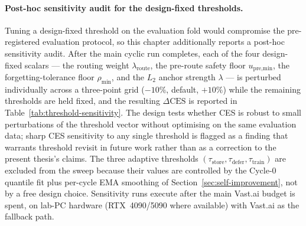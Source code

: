 

\paragraph{Post-hoc sensitivity audit for the design-fixed thresholds.}
\label{par:threshold-sensitivity}
Tuning a design-fixed threshold on the evaluation fold would compromise the pre-registered evaluation protocol, so this chapter additionally reports a post-hoc sensitivity audit. After the main cyclic run completes, each of the four design-fixed scalars --- the routing weight $\lambda_{\text{route}}$, the pre-route safety floor $u_{\text{pre,min}}$, the forgetting-tolerance floor $\rho_{\min}$, and the $L_{2}$ anchor strength $\lambda$ --- is perturbed individually across a three-point grid ($-10\%$, default, $+10\%$) while the remaining thresholds are held fixed, and the resulting $\Delta\text{CES}$ is reported in Table~\ref{tab:threshold-sensitivity}. The design tests whether CES is robust to small perturbations of the threshold vector without optimising on the same evaluation data; sharp CES sensitivity to any single threshold is flagged as a finding that warrants threshold revisit in future work rather than as a correction to the present thesis's claims. The three adaptive thresholds $(\tau_{\text{store}}, \tau_{\text{defer}}, \tau_{\text{train}})$ are excluded from the sweep because their values are controlled by the Cycle-0 quantile fit plus per-cycle EMA smoothing of Section~\ref{sec:self-improvement}, not by a free design choice. Sensitivity runs execute after the main Vast.ai budget is spent, on lab-PC hardware (RTX~4090/5090 where available) with Vast.ai as the fallback path.

